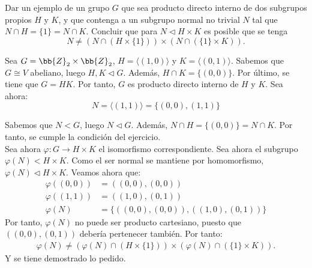 \begin{ejercicio}
    Dar un ejemplo de un grupo $G$ que sea producto directo interno de dos subgrupos propios $H$ y $K$, y que contenga a un subgrupo normal no trivial $N$ tal que $N\cap H=\{1\}=N\cap K$. Concluir que para $N\lhd H\times K$ es posible que se tenga
    \[
        N\neq (N\cap (H\times \{1\}))\times (N\cap (\{1\}\times K)).
    \]

    Sea $G=\bb{Z}_2\times \bb{Z}_2$, $H=\langle(1,0)\rangle$ y $K=\langle(0,1)\rangle$.
    Sabemos que $G\cong V$ abeliano, luego $H,K\lhd G$. Además, $H\cap K=\{(0,0)\}$. Por último, se tiene que $G=HK$. Por tanto, $G$ es producto directo interno de $H$ y $K$. Sea ahora:
    \begin{equation*}
        N=\langle(1,1)\rangle = \{(0,0),(1,1)\}
    \end{equation*}

    Sabemos que $N<G$, luego $N\lhd G$. Además, $N\cap H=\{(0,0)\}=N\cap K$. Por tanto, se cumple la condición del ejercicio.\\

    Sea ahora $\varphi:G\to H\times K$ el isomorfismo correspondiente. Sea ahora el subgrupo $\varphi(N)<H\times K$. Como el ser normal se mantiene por homomorfismo, $\varphi(N)\lhd H\times K$. Veamos ahora que:
    \begin{align*}
        \varphi((0,0))&=((0,0),(0,0))\\
        \varphi((1,1))&=((1,0),(0,1))\\
        \varphi(N) &= \{((0,0),(0,0)),((1,0),(0,1))\}
    \end{align*}
    Por tanto, $\varphi(N)$ no puede ser producto cartesiano, puesto que $((0,0),(0,1))$ debería pertenecer también. Por tanto:
    \begin{align*}
        \varphi(N)\neq (\varphi(N)\cap (H\times \{1\}))\times (\varphi(N)\cap (\{1\}\times K)).
    \end{align*}
    Y se tiene demostrado lo pedido.
\end{ejercicio}

